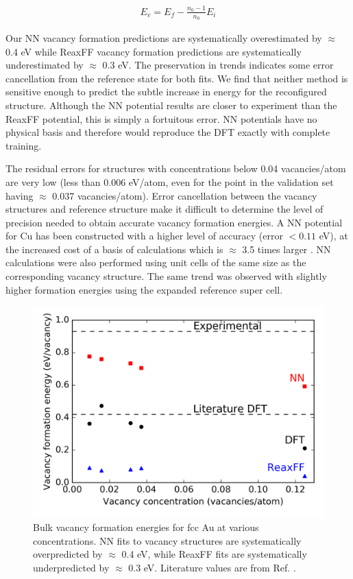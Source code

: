 \documentclass[12pt,oneside]{cmuthesis}
\begin{document}
\begin{eqnarray}
E_v = E_f - \frac{n_0 - 1}{n_0} E_i \label{eqn-vac}
\end{eqnarray}

Our NN vacancy formation predictions are systematically overestimated by \(\approx\) 0.4 eV while ReaxFF vacancy formation predictions are systematically underestimated by \(\approx\) 0.3 eV. The preservation in trends indicates some error cancellation from the reference state for both fits. We find that neither method is sensitive enough to predict the subtle increase in energy for the reconfigured structure. Although the NN potential results are closer to experiment than the ReaxFF potential, this is simply a fortuitous error.  NN potentials have no physical basis and therefore would reproduce the DFT exactly with complete training.

The residual errors for structures with concentrations below 0.04 vacancies/atom are very low (less than 0.006 eV/atom, even for the point in the validation set having \(\approx\) 0.037 vacancies/atom). Error cancellation between the vacancy structures and reference structure make it difficult to determine the level of precision needed to obtain accurate vacancy formation energies. A NN potential for Cu has been constructed with a higher level of accuracy (error \(< 0.11\) eV), at the increased cost of a basis of calculations which is \(\approx\) 3.5 times larger \cite{artrith-2012-high}. NN calculations were also performed using unit cells of the same size as the corresponding vacancy structure. The same trend was observed with slightly higher formation energies using the expanded reference super cell.

\begin{figure}[h]
\centering
\includegraphics[width=5.5in]{./images/fig-vacancy-formation.png}
\caption{\label{fig-vacancy-formation}
Bulk vacancy formation energies for fcc Au at various concentrations. NN fits to vacancy structures are systematically overpredicted by \(\approx\) 0.4 eV, while ReaxFF fits are systematically underpredicted by \(\approx\) 0.3 eV. Literature values are from Ref. .}
\end{figure}
\end{document}
